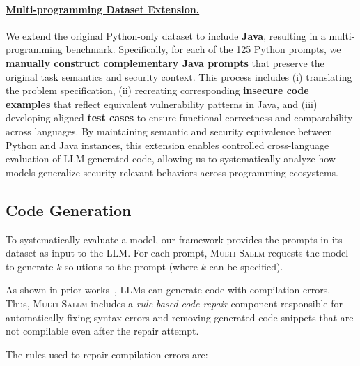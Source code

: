\documentclass[pdflatex,sn-mathphys-ay]{sn-jnl}
\newcommand{\sandoval}[0]{\textsc{Multi-Sallm}}
\begin{document}
\paragraph{\underline{Multi-programming Dataset Extension.}}
We extend the original Python-only dataset to include \textbf{Java}, resulting in a multi-programming benchmark. Specifically, for each of the 125 Python prompts, we \textbf{manually construct complementary Java prompts} that preserve the original task semantics and security context. This process includes (i) translating the problem specification, (ii) recreating corresponding \textbf{insecure code examples} that reflect equivalent vulnerability patterns in Java, and (iii) developing aligned \textbf{test cases} to ensure functional correctness and comparability across languages. By maintaining semantic and security equivalence between Python and Java instances, this extension enables controlled cross-language evaluation of LLM-generated code, allowing us to systematically analyze how models generalize security-relevant behaviors across programming ecosystems.

\subsection{Code Generation}\label{subsec:CodeGeneration}
To systematically evaluate a model, our framework provides the prompts in its dataset as input to the LLM. For each prompt, \sandoval{} requests the model to generate $k$ solutions to the prompt (where $k$ can be specified). 

As shown in prior works~\cite{ding2023static,siddiq2023exploring,siddiq2023franc}, LLMs can generate code with compilation errors. 
Thus, \sandoval{} includes a \textit{rule-based code repair} component responsible for automatically fixing syntax errors and removing generated code snippets that are not compilable even after the repair attempt. 

The rules used to repair compilation errors are:
\end{document}

